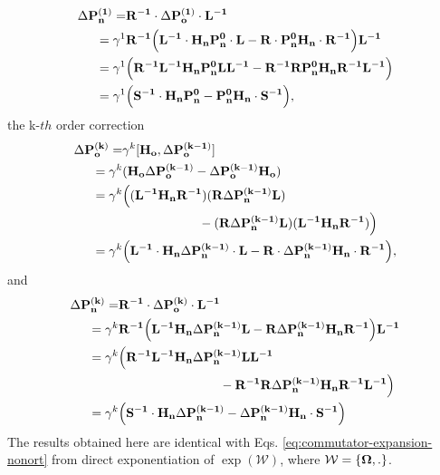\documentclass[journal=jctcce,manuscript=article,etalmode=truncate,maxauthors=10,layout=twocolumn,9pt]{achemso}   %
\begin{document}
\begin{align*}        
\Delta \vb{ P_n^{(1)}} = & \vb{R^{-1}} \cdot \Delta \vb{ P_o^{(1)}} \cdot \vb{ L^{-1} } \\
= \gamma^1  & \vb{R^{-1}} 
    \Big(  \vb{ L^{-1} \cdot   H_n P_n^0  \cdot  L } -  \vb{ R \cdot  P_n^0 H_n\cdot R^{-1} } \Big) \vb{ L^{-1} } \\
= \gamma^1 &
    \Big( \vb{R^{-1}} \vb{ L^{-1} H_n P_n^0 L} \vb{ L^{-1} } - \vb{ \vb{R^{-1}} R  P_n^0 H_n  R^{-1}\vb{ L^{-1}}} \Big) \\
= \gamma^1 &
    \Big( \vb{S^{-1} \cdot H_n P_n^0 }  - \vb{   P_n^0 H_n\cdot S^{-1}}   \Big), 
\end{align*}
  the k-$th$ order correction
\begin{align*}
\Delta \vb{ P_o^{(k)}} = & \gamma^k  [\vb{H_o}, \Delta \vb{P_o^{(k-1)} }] \\
        =  \gamma^{k} & ( \vb{H_o}\Delta \vb{ P_o^{(k-1)}} - \Delta \vb{P_o^{(k-1)} H_o  } ) \\
        =  \gamma^{k} & \Big(\vb{ (L^{-1} H_n R^{-1})( R} \Delta \vb{P_n^{(k-1)} L)}  \\
         & {\qquad \qquad \qquad }  -  (\vb{R} \Delta \vb{ P_n^{(k-1)} L)(L^{-1} H_n R^{-1}) }\Big)\\
        =  \gamma^k & \Big( \vb{ L^{-1} \cdot   H_n } \Delta \vb{ P_n^{(k-1)}  \cdot  L } 
            -  \vb{ R} \cdot \Delta \vb{ P_n^{(k-1)} H_n\cdot R^{-1} }\Big),
\end{align*}
and 
\begin{align}        
 \Delta \vb{ P_n^{(k)}} = & \vb{R^{-1}} \cdot \Delta \vb{ P_o^{(k)}} \cdot \vb{ L^{-1} } \\
\nonumber = \gamma^{k}  & \vb{R^{-1}} 
    \Big(  \vb{ L^{-1}}  \vb{H_n} \Delta \vb{P_n^{(k-1)}  L} - \vb{ R}  \Delta \vb{P_n^{(k-1)} H_n  R^{-1} } \Big) \vb{ L^{-1} } \\
\nonumber = \gamma^{k} &
    \Big( \vb{R^{-1} L^{-1} H_n} \Delta \vb{P_n^{(k-1)} L  L^{-1} } \\
\nonumber     & {\qquad \qquad \qquad \qquad } -  \vb{R^{-1} R }\Delta \vb{P_n^{(k-1)} H_n  R^{-1} L^{-1}} \Big) \\
\nonumber = \gamma^{k} &
    \Big( \vb{S^{-1} \cdot H_n} \Delta \vb{P_n^{(k-1)} }  - \Delta \vb{ P_n^{(k-1)} H_n\cdot S^{-1}}   \Big) 
\end{align}
The results obtained here are identical with  Eqs. \ref{eq:commutator-expansion-nonort}  from direct exponentiation of  $\exp(\mathcal{W})$,  where $\mathcal{W}=\{\vb{\Omega,.} \}$.






\balance

\balance 
\end{document}
